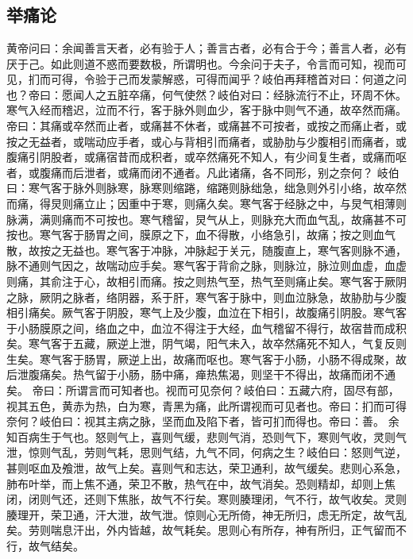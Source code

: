 \documentclass[a4paper,12pt,UTF8,twoside]{ctexbook}
\begin{document}
\part{}
\chapter{举痛论}
黄帝问曰：余闻善言天者，必有验于人；善言古者，必有合于今；善言人者，必有厌于己。如此则道不惑而要数极，所谓明也。今余问于夫子，令言而可知，视而可见，扪而可得，令验于己而发蒙解惑，可得而闻乎？岐伯再拜稽首对曰：何道之问也？帝曰：愿闻人之五脏卒痛，何气使然？岐伯对曰：经脉流行不止，环周不休。寒气入经而稽迟，泣而不行，客于脉外则血少，客于脉中则气不通，故卒然而痛。
帝曰：其痛或卒然而止者，或痛甚不休者，或痛甚不可按者，或按之而痛止者，或按之无益者，或喘动应手者，或心与背相引而痛者，或胁肋与少腹相引而痛者，或腹痛引阴股者，或痛宿昔而成积者，或卒然痛死不知人，有少间复生者，或痛而呕者，或腹痛而后泄者，或痛而闭不通者。凡此诸痛，各不同形，别之奈何？
岐伯曰：寒气客于脉外则脉寒，脉寒则缩踡，缩踡则脉绌急，绌急则外引小络，故卒然而痛，得炅则痛立止；因重中于寒，则痛久矣。寒气客于经脉之中，与炅气相薄则脉满，满则痛而不可按也。寒气稽留，炅气从上，则脉充大而血气乱，故痛甚不可按也。寒气客于肠胃之间，膜原之下，血不得散，小络急引，故痛；按之则血气散，故按之无益也。寒气客于冲脉，冲脉起于关元，随腹直上，寒气客则脉不通，脉不通则气因之，故喘动应手矣。寒气客于背俞之脉，则脉泣，脉泣则血虚，血虚则痛，其俞注于心，故相引而痛。按之则热气至，热气至则痛止矣。寒气客于厥阴之脉，厥阴之脉者，络阴器，系于肝，寒气客于脉中，则血泣脉急，故胁肋与少腹相引痛矣。厥气客于阴股，寒气上及少腹，血泣在下相引，故腹痛引阴股。寒气客于小肠膜原之间，络血之中，血泣不得注于大经，血气稽留不得行，故宿昔而成积矣。寒气客于五藏，厥逆上泄，阴气竭，阳气未入，故卒然痛死不知人，气复反则生矣。寒气客于肠胃，厥逆上出，故痛而呕也。寒气客于小肠，小肠不得成聚，故后泄腹痛矣。热气留于小肠，肠中痛，瘅热焦渴，则坚干不得出，故痛而闭不通矣。
帝曰：所谓言而可知者也。视而可见奈何？岐伯曰：五藏六府，固尽有部，视其五色，黄赤为热，白为寒，青黑为痛，此所谓视而可见者也。帝曰：扪而可得奈何？岐伯曰：视其主病之脉，坚而血及陷下者，皆可扪而得也。帝曰：善。
余知百病生于气也。怒则气上，喜则气缓，悲则气消，恐则气下，寒则气收，灵则气泄，惊则气乱，劳则气耗，思则气结，九气不同，何病之生？岐伯曰：怒则气逆，甚则呕血及飧泄，故气上矣。喜则气和志达，荣卫通利，故气缓矣。悲则心系急，肺布叶举，而上焦不通，荣卫不散，热气在中，故气消矣。恐则精却，却则上焦闭，闭则气还，还则下焦胀，故气不行矣。寒则腠理闭，气不行，故气收矣。灵则腠理开，荣卫通，汗大泄，故气泄。惊则心无所倚，神无所归，虑无所定，故气乱矣。劳则喘息汗出，外内皆越，故气耗矣。思则心有所存，神有所归，正气留而不行，故气结矣。
\end{document}
